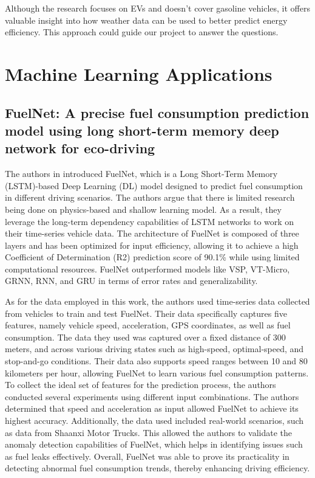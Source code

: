 \documentclass[letterpaper]{article}
\begin{document}
Although the research focuses on EVs and doesn't cover gasoline vehicles, it offers
valuable insight into how weather data can be used to better predict energy
efficiency. This approach could guide our project to answer the questions.

\section*{Machine Learning Applications}

\subsection*{FuelNet: A precise fuel consumption prediction model using long
short-term memory deep network for eco-driving}

The authors in \cite{wang2020fuelnet} introduced FuelNet, which is a Long
Short-Term Memory (LSTM)-based Deep Learning (DL) model designed to predict fuel
consumption in different driving scenarios. The authors argue that there is
limited research being done on physics-based and shallow learning model. As a
result, they leverage the long-term dependency capabilities of LSTM networks to
work on their time-series vehicle data. The architecture of FuelNet is composed
of three layers and has been optimized for input efficiency, allowing it to
achieve a high Coefficient of Determination (R2) prediction score of 90.1\% while
using limited computational resources. FuelNet outperformed models like VSP,
VT-Micro, GRNN, RNN, and GRU in terms of error rates and generalizability. 

As for the data employed in this work, the authors used time-series data collected
from vehicles to train and test FuelNet. Their data specifically captures five
features, namely vehicle speed, acceleration, GPS coordinates, as well as fuel
consumption. The data they used was captured over a fixed distance of 300 meters,
and across various driving states such as high-speed, optimal-speed, and
stop-and-go conditions. Their data also supports speed ranges between 10 and 80
kilometers per hour, allowing FuelNet to learn various fuel consumption patterns.
To collect the ideal set of features for the prediction process, the authors
conducted several experiments using different input combinations. The authors
determined that speed and acceleration as input allowed FuelNet to achieve its
highest accuracy. Additionally, the data used included real-world scenarios,
such as data from Shaanxi Motor Trucks. This allowed the authors to validate the
anomaly detection capabilities of FuelNet, which helps in identifying issues
such as fuel leaks effectively. Overall, FuelNet was able to prove its
practicality in detecting abnormal fuel consumption trends, thereby enhancing
driving efficiency.
\end{document}
